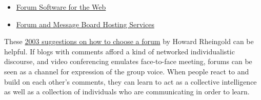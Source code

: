 \begin{itemize}
\itemsep1pt\parskip0pt
\item
  \href{http://thinkofit.com/webconf/forumsoft.htm}{Forum Software for
  the Web}
\item
  \href{http://thinkofit.com/webconf/hostsites.htm}{Forum and Message
  Board Hosting Services}
\end{itemize}

These
\href{https://docs.google.com/document/d/1D606u7SfVD3p7xH0lbf2mOO1hIdX97r7kVe753hSYeE/edit}{2003
suggestions on how to choose a forum} by Howard Rheingold can be
helpful. If blogs with comments afford a kind of networked
individualistic discourse, and video conferencing emulates face-to-face
meeting, forums can be seen as a channel for expression of the group
voice. When people react to and build on each other's comments, they can
learn to act as a collective intelligence as well as a collection of
individuals who are communicating in order to learn.

~
